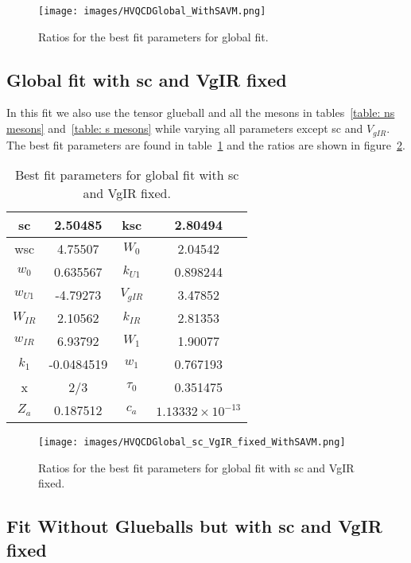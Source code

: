 \documentclass[a4paper,12pt]{article}
\begin{document}
\begin{figure}
  \center
  \texttt{[image: images/HVQCDGlobal\_WithSAVM.png]} 
  \caption{Ratios for the best fit parameters for global fit.}
  \label{figure: global fit ratios}
\end{figure}

\subsection{Global fit with sc and VgIR fixed}

In this fit we also use the tensor glueball  and all the mesons in tables~\ref{table: ns mesons} and~\ref{table: s mesons} while varying all parameters except sc and $V_{gIR}$. The best fit parameters are found in table~\ref{table: global fit parameters sc VgIR fixed} and the ratios are shown in figure~\ref{figure: global fit ratios sc VgIR fixed}.

\begin{table}
\centering
\begin{tabular}{ | c | c | c | c |}
\hline
sc & 2.50485 & ksc & 2.80494 \\
\hline
wsc & 4.75507 & $W_0$ & 2.04542 \\
\hline
$w_0$ & 0.635567 & $k_{U1}$ & 0.898244 \\
\hline
$w_{U1}$ & -4.79273 & $V_{gIR}$ & 3.47852 \\
\hline
$W_{IR}$ & 2.10562 & $k_{IR}$ & 2.81353 \\
\hline
$w_{IR}$ & 6.93792 & $W_1$ & 1.90077 \\
\hline
$k_1$ & -0.0484519 & $w_1$ & 0.767193 \\
\hline
x & 2/3 & $\tau_0$ & 0.351475\\
\hline
$Z_a$ & 0.187512 & $c_a$ & $1.13332 \times 10^{-13}$ \\
\hline
\end{tabular}
\caption{Best fit parameters for global fit with sc and VgIR fixed.}
\label{table: global fit parameters sc VgIR fixed} 
\end{table}

\begin{figure}
  \center
  \texttt{[image: images/HVQCDGlobal\_sc\_VgIR\_fixed\_WithSAVM.png]} 
  \caption{Ratios for the best fit parameters for global fit with sc and VgIR fixed.}
  \label{figure: global fit ratios sc VgIR fixed}
\end{figure}

\subsection{Fit Without Glueballs but with sc and VgIR fixed}
\end{document}
